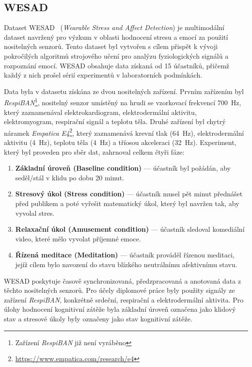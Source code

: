 \subsection{WESAD}
\label{subsec:wesad}
Dataset WESAD~\cite{wesadDataset} (\textit{Wearable Stress and Affect
Detection}) je multimodální dataset navržený pro výzkum v oblasti hodnocení
stresu a emocí za použití nositelných senzorů. Tento dataset byl vytvořen s
cílem přispět k vývoji pokročilých algoritmů strojového učení pro analýzu
fyziologických signálů a rozpoznání emocí. WESAD obsahuje data získaná od 15
účastníků, přičemž každý z nich prošel sérií experimentů v laboratorních
podmínkách.

Data byla v datasetu získána ze dvou nositelných zařízení. Prvním zařízením byl
\textit{RespiBAN}\footnote{Zařízení \textit{RespiBAN} již není vyráběno},
nositelný senzor umístěný na hrudi se vzorkovací frekvencí 700~Hz, který
zaznamenával elektrokardiogram, elektrodermální aktivitu, elektromyogram,
respirační signál a teplotu těla. Druhé zařízení byl chytrý náramek
\textit{Empatica E4}\footnote{\url{https://www.empatica.com/research/e4}}, který
zaznamenává krevní tlak (64~Hz), elektrodermální aktivitu (4~Hz), teplotu těla
(4~Hz) a tříosou akceleraci (32~Hz). Experiment, který byl proveden pro sběr
dat, zahrnoval celkem čtyři fáze:
\begin{enumerate}
    \item \textbf{Základní úroveň (Baseline condition)} --- účastník byl požádán, aby
    seděl/stál v klidu po dobu 20 minut.
    \item  \textbf{Stresový úkol (Stress condition)} --- účastník musel pět minut
    přednášet před publikem a poté vyřešit matematický úkol, který byl navržen
    tak, aby vyvolal stres.
    \item  \textbf{Relaxační úkol (Amusement condition)} --- účastník sledoval
    komediální video, které mělo vyvolat příjemné emoce.
    \item  \textbf{Řízená meditace (Meditation)} --- účastník prováděl řízenou
    meditaci, jejíž cílem bylo navození do stavu blízkého neutrálnímu
    afektivnímu stavu.
\end{enumerate}

WESAD poskytuje časově synchronizovaná, předzpracovaná a anotovaná data z těchto
nositelných senzorů. Pro účely diplomové práce byly použity signály ze zařízení
\textit{RespiBAN}, konkrétně srdeční, respirační a elektrodermální aktivita. Pro
úlohy hodnocení kognitivní zátěže byla základní úroveň označena jako klidový stav
a stresové úkoly byly označeny jako stav kognitivní zátěže.

